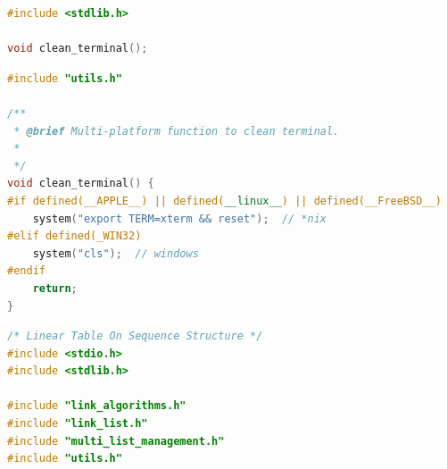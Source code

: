 \documentclass[supercite]{Experimental_Report}
\theoremstyle{definition}
\begin{document}
\begin{lstlisting}[caption={$utils.h$}, language=C++, frame=single]
#include <stdlib.h>

void clean_terminal();
\end{lstlisting}

\begin{lstlisting}[caption={$utils.cpp$}, language=C++, frame=single]
#include "utils.h"

/**
 * @brief Multi-platform function to clean terminal.
 *
 */
void clean_terminal() {
#if defined(__APPLE__) || defined(__linux__) || defined(__FreeBSD__)
    system("export TERM=xterm && reset");  // *nix
#elif defined(_WIN32)
    system("cls");  // windows
#endif
    return;
}
\end{lstlisting}

\begin{lstlisting}[caption={$main.cpp$}, language=C++, frame=single]
/* Linear Table On Sequence Structure */
#include <stdio.h>
#include <stdlib.h>

#include "link_algorithms.h"
#include "link_list.h"
#include "multi_list_management.h"
#include "utils.h"


\end{lstlisting}
\end{document}
